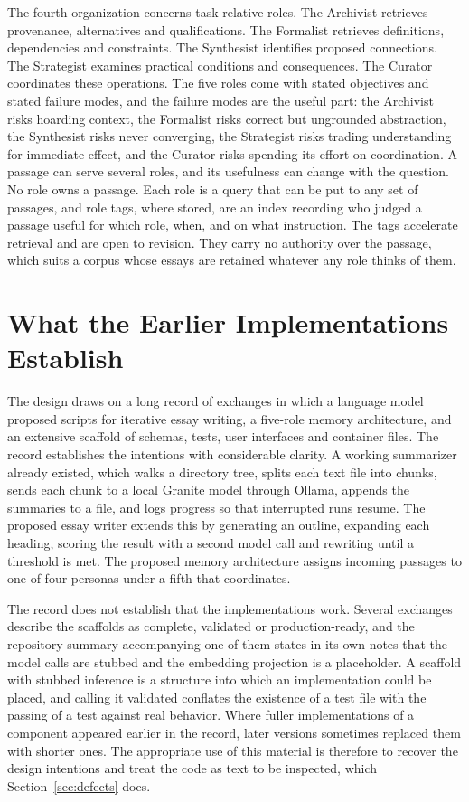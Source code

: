 \documentclass[11pt]{article}
\begin{document}
The fourth organization concerns task-relative roles. The Archivist retrieves provenance, alternatives and qualifications. The Formalist retrieves definitions, dependencies and constraints. The Synthesist identifies proposed connections. The Strategist examines practical conditions and consequences. The Curator coordinates these operations. The five roles come with stated objectives and stated failure modes, and the failure modes are the useful part: the Archivist risks hoarding context, the Formalist risks correct but ungrounded abstraction, the Synthesist risks never converging, the Strategist risks trading understanding for immediate effect, and the Curator risks spending its effort on coordination. A passage can serve several roles, and its usefulness can change with the question. No role owns a passage. Each role is a query that can be put to any set of passages, and role tags, where stored, are an index recording who judged a passage useful for which role, when, and on what instruction. The tags accelerate retrieval and are open to revision. They carry no authority over the passage, which suits a corpus whose essays are retained whatever any role thinks of them.

\section{What the Earlier Implementations Establish}

The design draws on a long record of exchanges in which a language model proposed scripts for iterative essay writing, a five-role memory architecture, and an extensive scaffold of schemas, tests, user interfaces and container files. The record establishes the intentions with considerable clarity. A working summarizer already existed, which walks a directory tree, splits each text file into chunks, sends each chunk to a local Granite model through Ollama, appends the summaries to a file, and logs progress so that interrupted runs resume. The proposed essay writer extends this by generating an outline, expanding each heading, scoring the result with a second model call and rewriting until a threshold is met. The proposed memory architecture assigns incoming passages to one of four personas under a fifth that coordinates.

The record does not establish that the implementations work. Several exchanges describe the scaffolds as complete, validated or production-ready, and the repository summary accompanying one of them states in its own notes that the model calls are stubbed and the embedding projection is a placeholder. A scaffold with stubbed inference is a structure into which an implementation could be placed, and calling it validated conflates the existence of a test file with the passing of a test against real behavior. Where fuller implementations of a component appeared earlier in the record, later versions sometimes replaced them with shorter ones. The appropriate use of this material is therefore to recover the design intentions and treat the code as text to be inspected, which Section~\ref{sec:defects} does.
\end{document}
